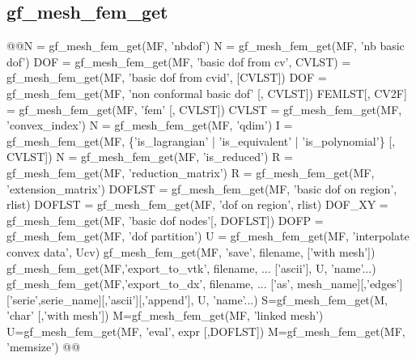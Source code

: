 \subsection{gf\_mesh\_fem\_get}
\begin{synopsis}
@@\tint N = gf\_mesh\_fem\_get(MF, 'nbdof')
\tint N = gf\_mesh\_fem\_get(MF, 'nb basic dof')
\tivec DOF = gf\_mesh\_fem\_get(MF, 'basic dof from cv', \tivec CVLST)
 = gf\_mesh\_fem\_get(MF, 'basic dof from cvid', [\tivec CVLST])
\tivec DOF = gf\_mesh\_fem\_get(MF, 'non conformal basic dof' [, \tivec CVLST])
\tfem FEMLST[, \tivec CV2F] = gf\_mesh\_fem\_get(MF, 'fem' [, \tivec CVLST])
\tivec CVLST = gf\_mesh\_fem\_get(MF, 'convex\_index')
\tint N = gf\_mesh\_fem\_get(MF, 'qdim')
\tivec I = gf\_mesh\_fem\_get(MF, \{'is\_lagrangian' | 'is\_equivalent' | 'is\_polynomial'\} 
        [, \tivec CVLST])
\tint N = gf\_mesh\_fem\_get(MF, 'is\_reduced')
\tspmat R = gf\_mesh\_fem\_get(MF, 'reduction\_matrix')
\tspmat R = gf\_mesh\_fem\_get(MF, 'extension\_matrix')
\tivec DOFLST = gf\_mesh\_fem\_get(MF, 'basic dof on region', \tivec rlist)
\tivec DOFLST = gf\_mesh\_fem\_get(MF, 'dof on region', \tivec rlist)
\tmat DOF\_XY = gf\_mesh\_fem\_get(MF, 'basic dof nodes'[, \tivec DOFLST])
\tivec DOFP = gf\_mesh\_fem\_get(MF, 'dof partition')
\tvec U = gf\_mesh\_fem\_get(MF, 'interpolate convex data', \tvec Ucv)
gf\_mesh\_fem\_get(MF, 'save', \tstr filename, ['with mesh'])
gf\_mesh\_fem\_get(MF,'export_to_vtk', filename, ... ['ascii'], U, 'name'...)
gf_mesh_fem_get(MF,'export_to_dx', filename, ... ['as', mesh_name][,'edges']['serie',serie_name][,'ascii'][,'append'], U, 'name'...)
\tstr S=gf_mesh_fem_get(M, 'char' [,'with mesh'])
\tmesh M=gf_mesh_fem_get(MF, 'linked mesh')
\tvec U=gf_mesh_fem_get(MF, 'eval', expr [,\tivec DOFLST])
M=gf_mesh_fem_get(MF, 'memsize')
@@\end{synopsis}
